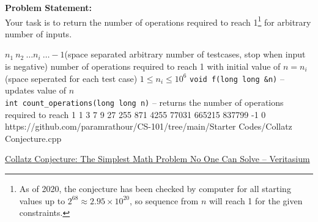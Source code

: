 \textbf{Problem Statement:}\\
Your task is to return the number of operations required to reach 1\footnote{As of 2020, the conjecture has been checked by computer for all starting values up to $2^{68} \approx 2.95 \times 10^{20}$, so sequence from $n$ will reach 1 for the given constraints.} for arbitrary number of inputs.
\begin{testcasesFunction}
	{$n_1\ n_2\ \ldots n_i\ \ldots -1$\hfill(space separated arbitrary number of testcases, stop when input is negative)}
	{number of operations required to reach 1 with initial value of $n = n_i$ \hfill(space seperated for each test case)}
	{$1 \leq n_i \leq 10^{6}$}
	{\texttt{void f(long long \&n)} -- updates value of $n$\\
	\texttt{int count\_operations(long long n)} -- returns the number of operations required to reach 1}
	{1 3 7 9 27 255 871 4255 77031 665215 837799 -1}
	{0}
	{https://github.com/paramrathour/CS-101/tree/main/Starter Codes/Collatz Conjecture.cpp}
\end{testcasesFunction}
\begin{funvideo}
\href{https://youtu.be/094y1Z2wpJg}{Collatz Conjecture: The Simplest Math Problem No One Can Solve -- Veritasium}
\end{funvideo}
